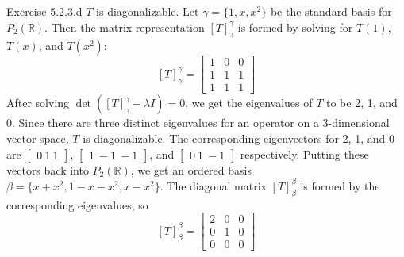 \documentclass{exam}
\begin{document}
\underline{Exercise 5.2.3.d}
\newline
\newline
$T$ is diagonalizable. Let $\gamma = \{1, x, x^2\}$ be the standard basis for $P_2(\mathbb{R})$. Then the matrix representation $[T]_\gamma^\gamma$ is formed by solving for $T(1)$, $T(x)$, and $T(x^2)$:
$$[T]_\gamma^\gamma =
\begin{bmatrix}
    1 & 0 & 0 \\
    1 & 1 & 1 \\
    1 & 1 & 1
\end{bmatrix}$$After solving $\det([T]_\gamma^\gamma-\lambda I)=0$, we get the eigenvalues of $T$ to be 2, 1, and 0. Since there are three distinct eigenvalues for an operator on a 3-dimensional vector space, $T$ is diagonalizable. The corresponding eigenvectors for 2, 1, and 0 are
$
\begin{bmatrix}
    0 \
    1 \
    1
\end{bmatrix}
$,
$
\begin{bmatrix}
    1 \
    -1 \
    -1
\end{bmatrix}
$, and
$
\begin{bmatrix}
    0 \
    1 \
    -1
\end{bmatrix}
$ respectively. Putting these vectors back into $P_2(\mathbb{R})$, we get an ordered basis $\beta=\{x+x^2, 1-x-x^2, x-x^2\}$. The diagonal matrix $[T]_\beta^\beta$ is formed by the corresponding eigenvalues, so
\[
[T]_\beta^\beta =
\begin{bmatrix}
    2 & 0 & 0 \\
    0 & 1 & 0 \\
    0 & 0 & 0
\end{bmatrix}
\]
\end{document}
